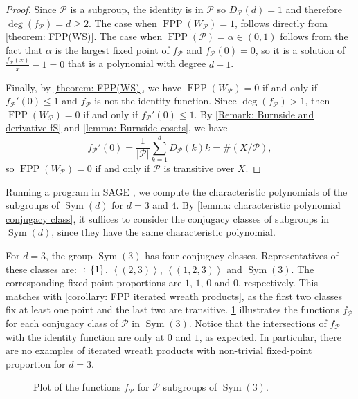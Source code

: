 \documentclass{amsart}
\def\set#1{{\def\st{\;:\;}\left\{#1\right\}}}
\def\abs#1{\left\vert{#1}\right\vert}
\def \<#1>{{\left\langle{#1}\right\rangle}}
\DeclareMathOperator{\FPP}{FPP}
\DeclareMathOperator{\Sym}{Sym}
\DeclareMathOperator{\st}{st}
\begin{document}
\begin{proof}
Since $\mathcal{P}$ is a subgroup, the identity is in $\mathcal{P}$ so $D_\mathcal{P}(d) = 1$ and therefore $\deg(f_\mathcal{P}) = d \geq 2$. The case when $\FPP(W_\mathcal{P}) = 1$, follows directly from \cref{theorem: FPP(WS)}. The case when $\FPP(\mathcal{P}) = \alpha \in (0,1)$ follows from the fact that $\alpha$ is the largest fixed point of $f_\mathcal{P}$ and $f_\mathcal{P}(0) = 0$, so it is a solution of $\frac{f_\mathcal{P}(x)}{x} - 1 = 0$ that is a polynomial with degree $d-1$. 

Finally, by \cref{theorem: FPP(WS)}, we have $\FPP(W_\mathcal{P}) = 0$ if and only if $f_\mathcal{P}'(0) \leq 1$ and $f_\mathcal{P}$ is not the identity function. Since $\deg(f_\mathcal{P}) > 1$, then $\FPP(W_\mathcal{P}) = 0$ if and only if $f_\mathcal{P}'(0) \leq 1$. By \cref{Remark: Burnside and derivative fS} and \cref{lemma: Burnside cosets}, we have $$f_\mathcal{P}'(0) = \frac{1}{\abs{\mathcal{P}}} \sum_{k = 1}^d D_\mathcal{P}(k) k = \#(X/\mathcal{P}),$$ so $\FPP(W_\mathcal{P}) = 0$ if and only if $\mathcal{P}$ is transitive over $X$. 
\end{proof}

Running a program in SAGE \cite{sagemath}, we compute the characteristic polynomials of the subgroups of $\Sym(d)$ for $d = 3$ and $4$. By \cref{lemma: characteristic polynomial conjugacy class}, it suffices to consider the conjugacy classes of subgroups in $\Sym(d)$, since they have the same characteristic polynomial.

For $d = 3$, the group $\Sym(3)$ has four conjugacy classes. Representatives of these classes are: $\set{1}$, $\<(2,3)>$, $\<(1,2,3)>$ and $\Sym(3)$. The corresponding fixed-point proportions are $1$, $1$, $0$ and $0$, respectively. This matches with \cref{corollary: FPP iterated wreath products}, as the first two classes fix at least one point and the last two are transitive. \cref{figure: FPPS3} illustrates the functions $f_\mathcal{P}$ for each conjugacy class of $\mathcal{P}$ in $\Sym(3)$. Notice that the intersections of $f_\mathcal{P}$ with the identity function are only at $0$ and $1$, as expected. In particular, there are no examples of iterated wreath products with non-trivial fixed-point proportion for $d = 3$.  

\begin{figure}[h!]
\caption{Plot of the functions $f_\mathcal{P}$ for $\mathcal{P}$ subgroups of $\Sym(3)$.}
\label{figure: FPPS3}
\end{figure}
\end{document}
